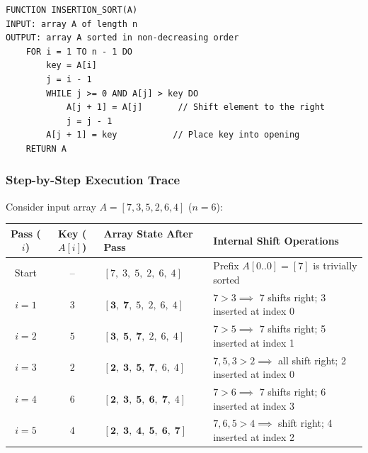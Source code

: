 \documentclass[11pt,a4paper]{article}
\begin{document}
\begin{lstlisting}[style=pseudostyle]
FUNCTION INSERTION_SORT(A)
INPUT: array A of length n
OUTPUT: array A sorted in non-decreasing order
    FOR i = 1 TO n - 1 DO
        key = A[i]
        j = i - 1
        WHILE j >= 0 AND A[j] > key DO
            A[j + 1] = A[j]       // Shift element to the right
            j = j - 1
        A[j + 1] = key           // Place key into opening
    RETURN A
\end{lstlisting}

\subsubsection{Step-by-Step Execution Trace}
Consider input array $A = [7, 3, 5, 2, 6, 4]$ ($n = 6$):
\begin{center}
\begin{tabular}{c c l p{7cm}}
\toprule
\textbf{Pass ($i$)} & \textbf{Key ($A[i]$)} & \textbf{Array State After Pass} & \textbf{Internal Shift Operations} \\
\midrule
Start & -- & $[7,\; 3,\; 5,\; 2,\; 6,\; 4]$ & Prefix $A[0..0] = [7]$ is trivially sorted \\
$i = 1$ & $3$ & $[\mathbf{3},\; \mathbf{7},\; 5,\; 2,\; 6,\; 4]$ & $7 > 3 \implies$ 7 shifts right; 3 inserted at index 0 \\
$i = 2$ & $5$ & $[\mathbf{3},\; \mathbf{5},\; \mathbf{7},\; 2,\; 6,\; 4]$ & $7 > 5 \implies$ 7 shifts right; 5 inserted at index 1 \\
$i = 3$ & $2$ & $[\mathbf{2},\; \mathbf{3},\; \mathbf{5},\; \mathbf{7},\; 6,\; 4]$ & $7, 5, 3 > 2 \implies$ all shift right; 2 inserted at index 0 \\
$i = 4$ & $6$ & $[\mathbf{2},\; \mathbf{3},\; \mathbf{5},\; \mathbf{6},\; \mathbf{7},\; 4]$ & $7 > 6 \implies$ 7 shifts right; 6 inserted at index 3 \\
$i = 5$ & $4$ & $[\mathbf{2},\; \mathbf{3},\; \mathbf{4},\; \mathbf{5},\; \mathbf{6},\; \mathbf{7}]$ & $7, 6, 5 > 4 \implies$ shift right; 4 inserted at index 2 \\
\bottomrule
\end{tabular}
\end{center}
\end{document}
